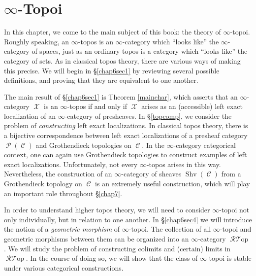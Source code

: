 \documentclass{report}[10pt, final]
\DeclareMathOperator{\Shv}{Shv}
\DeclareMathOperator{\RGeom}{\mathcal{R}{\mathcal T}op}
\DeclareMathOperator{\calC}{\mathcal{C}}
\DeclareMathOperator{\calX}{\mathcal{X}}
\DeclareMathOperator{\calP}{\mathcal{P}}
\theoremstyle{definition}
\begin{document}






\chapter{$\infty$-Topoi}\label{chap6}

\setcounter{theorem}{0}
\setcounter{subsection}{0}

In this chapter, we come to the main subject of this book: the theory of $\infty$-topoi.
Roughly speaking, an $\infty$-topos is an $\infty$-category which ``looks like'' the $\infty$-category of spaces, just as an ordinary topos is a category which ``looks like'' the category of sets. As in classical topos theory, there are various ways of making this precise. We will begin in \S \ref{chap6sec1} by reviewing several possible definitions, and proving that they are equivalent to one another.

The main result of \S \ref{chap6sec1} is Theorem \ref{mainchar}, which asserts that an $\infty$-category $\calX$ is an $\infty$-topos if and only if $\calX$ arises as an (accessible) left exact localization of an $\infty$-category of presheaves. In \S \ref{topcomp}, we consider the problem of {\em constructing} left exact localizations. In classical topos theory, there is a bijective correspondence between left exact localizations of a presheaf category $\calP(\calC)$ and Grothendieck topologies on $\calC$. In the $\infty$-category categorical context, one can again use Grothendieck topologies to construct examples of left exact localizations. 
Unfortunately, not every $\infty$-topos arises in this way. Nevertheless, the construction of an $\infty$-category of sheaves $\Shv(\calC)$ from a Grothendieck topology on $\calC$ is an extremely useful construction, which will play an important role throughout \S \ref{chap7}.

In order to understand higher topos theory, we will need to consider $\infty$-topoi not only individually, but in relation to one another. In \S \ref{chap6sec4} we will introduce the notion of a {\em geometric morphism} of $\infty$-topoi. The collection of all $\infty$-topoi and geometric morphisms between them can be organized into an $\infty$-category $\RGeom$. We will study the problem of constructing colimits and (certain) limits in $\RGeom$. In the course of doing so, we will show that the class of $\infty$-topoi is stable under various categorical constructions.
\end{document}
